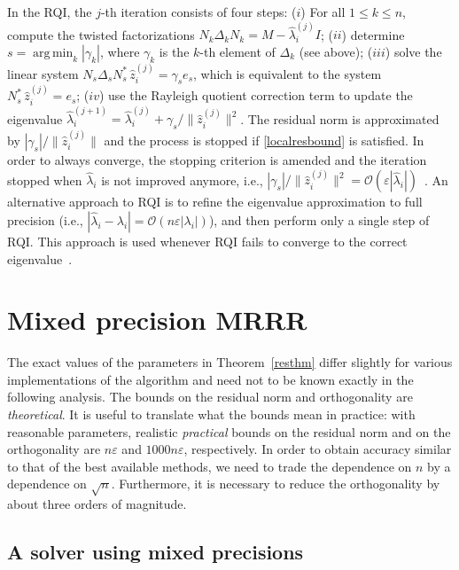 \documentclass[final]{siamltex}
\newcommand\norm[1]{\lVert#1\rVert}
\newcommand\order[1]{\mathcal{O}(#1)}
\begin{document}
In the RQI, the $j$-th iteration consists of four steps: ($i$) For all $1 \leq k \leq
n$, compute the twisted factorizations $N_k \Delta_k N_k = M -
\hat{\lambda}_i^{(j)} I$; ($ii$) determine $s = \operatorname*{arg\,min}_k
|\gamma_k|$, where $\gamma_k$ is the $k$-th element of $\Delta_k$ (see
above); ($iii$) solve the linear system $N_s \Delta_s N_s^* \,
\hat{z}_i^{(j)} = \gamma_s e_s$, which is equivalent to the system $N_s^* \,
\hat{z}_i^{(j)} = e_s$; ($iv$) use the 
Rayleigh quotient correction term to update the eigenvalue
$\hat{\lambda}_i^{(j+1)} = \hat{\lambda}_i^{(j)} +
\gamma_s/\norm{\hat{z}_i^{(j)}}^2$. The residual norm is
approximated by $|\gamma_s|/\norm{\hat{z}_i^{(j)}}$ and the process is stopped if
\eqref{localresbound} is satisfied. 
In order to always converge, the stopping criterion is amended and the
iteration stopped when $\hat{\lambda}_i$ is not improved anymore, i.e.,
$|\gamma_s|/\norm{\hat{z}_i^{(j)}}^2 = \order{\varepsilon
  |\hat{\lambda}_i|}$~\cite{NLA:NLA493}.  
An alternative approach to RQI is to refine the eigenvalue approximation to full
precision (i.e., $|\hat{\lambda}_i - \lambda_i| = \order{n \varepsilon
  |\lambda_i|}$), and then perform only a single step of RQI. This approach is used 
whenever RQI fails to converge to the correct eigenvalue~\cite{DesignMRRR}.



\section{Mixed precision MRRR}
\label{sec:mixedgeneral}

The exact values of the parameters in Theorem~\ref{resthm} differ
slightly for various implementations of the algorithm and need not to be
known exactly in the following analysis. The bounds on the residual norm and
orthogonality are {\it theoretical}. It is useful to translate what the bounds mean in practice: 
with reasonable parameters, realistic {\it practical} bounds on the residual
norm and on the orthogonality are $n \varepsilon$ and $1000 n \varepsilon$, respectively. 
In order to obtain accuracy similar to that of the best available methods,
we need to trade the 
dependence on $n$ by a dependence on $\sqrt{n}$. Furthermore, it is
necessary to reduce the orthogonality by about three orders of
magnitude.

\subsection{A solver using mixed precisions}
\end{document}

